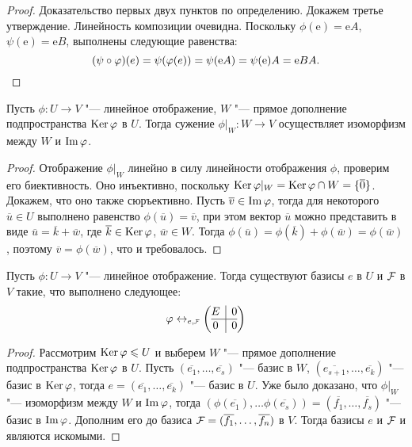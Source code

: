     \begin{proof}
        Доказательство первых двух пунктов по определению. Докажем третье утверждение. Линейность композиции очевидна. Поскольку $\phi(\text{e}) = \text{e}A$, $\psi(\text{e}) = \text{e}B$, выполнены следующие равенства:
    	\[(\psi \circ \phi)(e) = \psi(\phi(e)) = \psi(\text{e}A) = \psi(\text{e})A = \text{e} BA.\qedhere\]
    \end{proof}
    
    \begin{proposition}
    	Пусть $\phi: U \rightarrow V$ "--- линейное отображение, $W$ "--- прямое дополнение подпространства $\ke{\phi}$ в $U$. Тогда сужение $\phi|_W : W \rightarrow V$ осуществляет изоморфизм между $W$ и $\im{\phi}$.
    \end{proposition}
    
    \begin{proof}
    	Отображение $\phi|_W$ линейно в силу линейности отображения $\phi$, проверим его биективность. Оно инъективно, поскольку $\ke{\phi|_W} = \ke{\phi} \cap W = \{\overline{0}\}$. Докажем, что оно также сюръективно. Пусть $\overline{v} \in \im{\phi}$, тогда для некоторого $\overline{u} \in U$ выполнено равенство $\phi(\overline{u}) = \overline{v}$, при этом вектор $\overline u$ можно представить в виде $\overline{u} = \overline{k} + \overline{w}$, где $\overline{k} \in \ke{\phi}$, $\overline{w} \in W$. Тогда $\phi(\overline{u}) = \phi(\overline{k}) + \phi(\overline{w}) = \phi(\overline{w})$, поэтому $\overline{v} = \phi(\overline{w})$, что и требовалось.
    \end{proof}
    
    \begin{theorem}
    	Пусть $\phi: U \rightarrow V$ "--- линейное отображение. Тогда существуют базисы $e$ в $U$ и $\FF $ в $V$ такие, что выполнено следующее:
    	\[\phi \leftrightarrow_{e, \FFF} \left(\begin{array}{@{}c|c@{}}
    	E & 0\\
    	\hline
    	0 & 0
    	\end{array}\right)\]
    \end{theorem}
    
    \begin{proof}
    	Рассмотрим $\ke{\phi} \le U$ и выберем $W$ "--- прямое дополнение подпространства $\ke{\phi}$ в $U$. Пусть $(\overline{e_1}, \dots, \overline{e_s})$ "--- базис в $W$, $(\overline{e_{s+1}}, \dots, \overline{e_k})$ "--- базис в $\ke{\phi}$, тогда $e = (\overline{e_1}, \dots, \overline{e_k})$ "--- базис в $U$. Уже было доказано, что $\phi|_W$ "--- изоморфизм между $W$ и $\im{\phi}$, тогда $(\phi(\overline{e_1}), \dots \phi(\overline{e_s})) = (\overline{f_1}, \dots, \overline{f_s})$ "--- базис в $\im{\phi}$. Дополним его до базиса $\FF  = (\overline{f_1}, \dots, \overline{f_n})$ в $V$. Тогда базисы $e$ и $\FF $ и являются искомыми.
    \end{proof}
    
